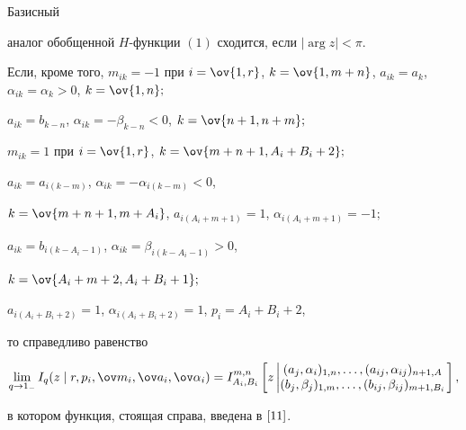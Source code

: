 \begin{thm} Базисный 


аналог обобщенной $H$-функции $(1)$ сходится, если $|\arg z|<\pi$. 


Если, кроме того, $m_{i k}=-1$ при $i=\ov{1,r}$, $k=\ov{1,m+n}$, $a_{i 


k}=a_k$, $\alpha_{i k}=\alpha_k>0$, $k=\ov{1,n};$ 


$a_{i k}=b_{k-n}$, $\alpha_{i k}=-\beta_{k-n}<0$, $k=\ov{n+1,n+m};$ 


$m_{i k}=1$ при $i=\ov{1,r}$, $k=\ov{m+n+1,A_i+B_i+2};$ 


$a_{i k}=a_{i(k-m)}$, $\alpha_{i k}=-\alpha_{i(k-m)}<0$, 


$k=\ov{m+n+1,m+A_i}$, $a_{i(A_i+m+1)}=1$, $\alpha_{i(A_i+m+1)}=-1;$ 


$a_{i k}=b_{i(k-A_i-1)}$, $\alpha_{i k}=\beta_{i(k-A_i-1)}>0$, 


$k=\ov{A_i+m+2,A_i+B_i+1};$ 


$a_{i(A_i+B_i+2)}=1$, $\alpha_{i(A_i+B_i+2)}=1$, $p_i=A_i+B_i+2$, 


то справедливо равенство 


$$ 


\lim_{q\to 1_-}I_q(z\mid r, p_i,\ov m_i,\ov a_i,\ov\alpha_i)= 


I^{m,n}_{A_i,B_i} 


\left[z\left|\begin{matrix}(a_j,\alpha_i)_{1,n},\dotsc, 


(a_{i j},\alpha_{i j})_{n+1,A}\\ 


(b_j,\beta_j)_{1,m},\dotsc,(b_{i j},\beta_{i j})_{m+1,B_i} 


\end{matrix}


\right.\right], 


$$ 


в котором функция, стоящая справа, введена в $\cite{11}$. 


\end{thm} 


 


